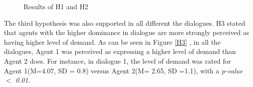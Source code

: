 \documentclass{llncs}
\begin{document}
	\begin{figure}[htb!]
	\setlength\fboxsep{0pt}\setlength\fboxrule{0.75pt}
	{
	\caption{Results of H1 and H2}
	
	}
	\end{figure}%
	
	\par The third hypothesis was also supported in all different the dialogues. H3 stated that agents with the higher dominance in dialogue are more strongly perceived as having higher level of demand. As can be seen in Figure \ref{H3} , in all the dialogues, Agent 1 was perceived as expressing a higher level of demand than Agent 2 does. For instance, in dialogue 1, the level of demand was rated for Agent 1(M=4.07, SD = 0.8) versus Agent 2(M= 2.65, SD =1.1), with a \textit{p-value $<$ 0.01}.
	
\end{document}
